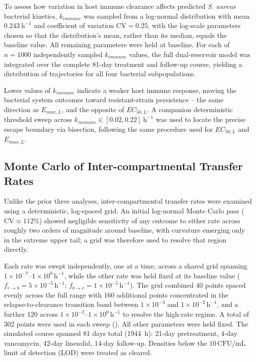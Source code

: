 \documentclass[12pt, draftcls, onecolumn]{IEEEtran}
\begin{document}
To assess how variation in host immune clearance affects predicted
\textit{S. aureus} bacterial kinetics, $k_{immune}$ was sampled from a
log-normal distribution with mean $0.243~\mathrm{h}^{-1}$ and coefficient of
variation $\mathrm{CV} = 0.25$, with the log-scale parameters chosen so
that the distribution's mean, rather than its median, equals the baseline
value. All remaining parameters were held at baseline. For each of
$n = 1000$ independently sampled $k_{immune}$ values, the full
dual-reservoir model was integrated over the complete 81-day treatment and
follow-up course, yielding a distribution of trajectories for all four
bacterial subpopulations.

Lower values of $k_{immune}$ indicate a weaker host immune response,
moving the bacterial system outcomes toward resistant-strain persistence
-- the same direction as $E_{max,L}$, and the opposite of $EC_{50,L}$. A
companion deterministic threshold sweep across $k_{immune} \in
[0.02, 0.22]~\mathrm{h}^{-1}$ was used to locate the precise escape
boundary via bisection, following the same procedure used for $EC_{50,L}$
and $E_{max,L}$.

\subsection{Monte Carlo of Inter-compartmental Transfer Rates}
Unlike the prior three analyses, inter-compartmental transfer rates were examined using a deterministic, log-spaced grid. An initial log-normal Monte Carlo pass ($\mathrm{CV} \approx 112\%$) showed negligible sensitivity of any outcome to either rate across roughly two orders of magnitude around baseline, with curvature emerging only in the extreme upper tail; a grid was therefore used to resolve that region directly.

Each rate was swept independently, one at a time, across a shared grid spanning $1\times10^{-7}$--$1\times10^{0}\,\mathrm{h}^{-1}$, while the other rate was held fixed at its baseline value ($f_{r \to b} = 5\times10^{-5}\,\mathrm{h}^{-1}$; $f_{b \to r} = 1\times10^{-5}\,\mathrm{h}^{-1}$). The grid combined 40 points spaced evenly across the full range with 160 additional points concentrated in the relapse-to-clearance transition band between $1\times10^{-3}$ and $1\times10^{-2}\,\mathrm{h}^{-1}$, and a further 120 across $1\times10^{-2}$--$1\times10^{0}\,\mathrm{h}^{-1}$ to resolve the high-rate regime. A total of 302 points were used in each sweep (). All other parameters were held fixed. The simulated course spanned 81 days total (1944~h): 21-day pretreatment, 4-day vancomycin, 42-day linezolid, 14-day follow-up. Densities below the $10\,\mathrm{CFU/mL}$ limit of detection (LOD) were treated as cleared.
\end{document}
